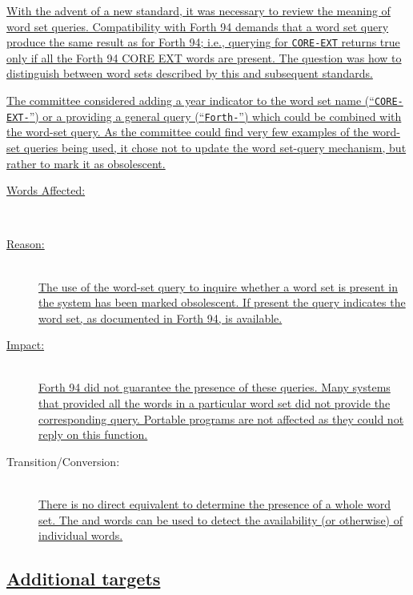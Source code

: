 \uline{With the advent of a new standard, it was necessary to review the meaning
of word set queries.  Compatibility with Forth 94 demands that a word set
query produce the same result as for Forth 94; i.e., querying for
\texttt{CORE-EXT} returns true only if all the Forth 94 CORE EXT words
are present.  The question was how to distinguish between word sets
described by this and subsequent standards.}

\uline{The committee considered adding a year indicator to the word set name
(``\texttt{CORE-EXT-\snapshot}'') or a providing a general query
(``\texttt{Forth-\snapshot}'') which could be combined with the
word-set query.  As the committee could find very few examples of the
word-set queries being used, it chose not to update the word set-query
mechanism, but rather to mark it as obsolescent.}

\begin{description}
\item[\uline{Words Affected:}] ~\\
	\uline{}

\item[\uline{Reason:}] ~\\
	\uline{The use of the word-set query to inquire whether a word set is
	present in the system has been marked obsolescent.  If present the
	query indicates the word set, as documented in Forth 94, is available.}

\item[\uline{Impact:}] ~\\
	\uline{Forth 94 did not guarantee the presence of these queries.  Many
	systems that provided all the words in a particular word set did not
	provide the corresponding query.  Portable programs are not affected
	as they could not reply on this function.}

\item[Transition/Conversion:] ~\\
	\uline{There is no direct equivalent to determine the presence of a whole
	word set.  The  and 
	words can be used to detect the availability (or otherwise) of individual
	words.}
\end{description}

\subsection[Additional \word{TO} targets]{\uline{Additional  targets}} %
\label{diff:12:to}

